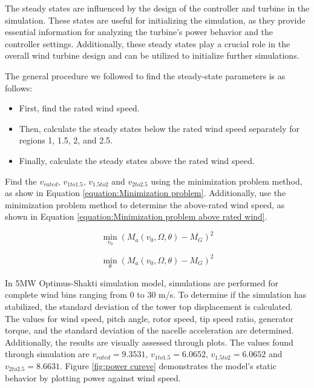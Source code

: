 
The steady states are influenced by the design of the controller and turbine in the simulation. These states are useful for initializing the simulation, as they provide essential information for analyzing the turbine's power behavior and the controller settings. Additionally, these steady states play a crucial role in the overall wind turbine design and can be utilized to initialize further simulations.

The general procedure we followed to find the steady-state parameters is as follows: 
\begin{itemize}
	\item First, find the rated wind speed. 
	\item Then, calculate the steady states below the rated wind speed separately for regions 1, 1.5, 2, and 2.5. 
	\item Finally, calculate the steady states above the rated wind speed.
\end{itemize}

Find the $v_{rated}$, $v_{1to1.5}$, $v_{1.5to2}$ and $v_{2to2.5}$ using the minimization problem method, as show in Equation \ref{equation:Minimization problem}. Additionally, use the minimization problem method to determine the above-rated wind speed, as shown in Equation \ref{equation:Minimization problem above rated wind}.

\begin{equation}
	\min_{v_0} \left( M_a(v_0, \Omega, \theta) - M_G \right)^2
	\label{equation:Minimization problem}
\end{equation}


\begin{equation}
	\min_{\theta} \left( M_a(v_0, \Omega, \theta) - M_G \right)^2
	\label{equation:Minimization problem above rated wind}
\end{equation}

In 5MW Optimus-Shakti simulation model, simulations are performed for complete wind bins ranging from 0 to 30 m/s. To determine if the simulation has stabilized, the standard deviation of the tower top displacement is calculated. The values for wind speed, pitch angle, rotor speed, tip speed ratio, generator torque, and the standard deviation of the nacelle acceleration are determined. Additionally, the results are visually assessed through plots. The values found through simulation are $v_{rated} = 9.3531$, $v_{1to1.5} = 6.0652$, $v_{1.5to2} = 6.0652$ and $v_{2to2.5} = 8.6631$. Figure \ref{fig:power cureve} demonstrates the model's static behavior by plotting power against wind speed.

